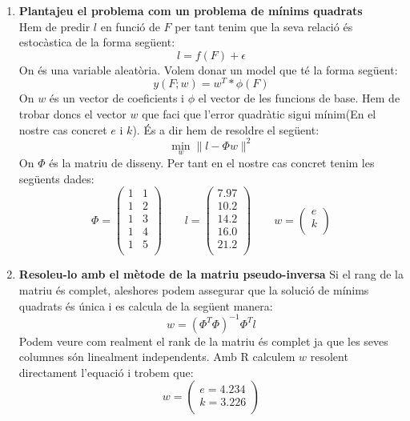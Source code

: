 \documentclass[a4paper]{article}
\begin{document}
\begin{enumerate}
	\item\textbf{Plantajeu el problema com un problema de mínims quadrats} \\
	Hem de predir $l$ en funció de $F$ per tant tenim que la seva relació és estocàstica de la forma següent:
	$$
	l = f(F) + \epsilon
	$$
	On \epsilon és una variable aleatòria. Volem donar un model que té la forma següent:
	$$
	y(F;w) = w^T * \phi(F)
	$$
	On $w$ és un vector de coeficients i $\phi$ el vector de les funcions de base. Hem de trobar doncs el vector $w$ que faci que l'error quadràtic sigui mínim(En el nostre cas concret $e$ i $k$). És a dir hem de resoldre el següent:
	$$
	\min_{w} \parallel l - \Phi w \parallel ^2
	$$
	On $\Phi$ és la matriu de disseny. Per tant en el nostre cas concret tenim les següents dades:
	$$
	\Phi = 
	\begin{pmatrix}
	1 & 1 \\
	1 & 2 \\
	1 & 3 \\
	1 & 4 \\
	1 & 5 \\
	\end{pmatrix}
	\qquad
	l =
	\begin{pmatrix}
	7.97 \\
	10.2 \\
	14.2 \\
	16.0 \\
	21.2 \\
	\end{pmatrix}
	\qquad
	w =
	\begin{pmatrix}
	e \\
	k \\
	\end{pmatrix}
	$$
	\newpage
	\item\textbf{Resoleu-lo amb el mètode de la matriu pseudo-inversa}
	Si el rang de la matriu és complet, aleshores podem assegurar que la solució de mínims quadrats és única i es calcula de la següent manera:
	$$
	w = (\Phi^T\Phi)^{-1}\Phi^Tl
	$$
	Podem veure com realment el rank de la matriu és complet ja que les seves columnes són linealment independents. Amb R calculem $w$ resolent directament l'equació i trobem que:
	$$
	w=
	\begin{pmatrix}
	e=4.234\\
	k=3.226\\
	\end{pmatrix}
	$$
	\begin{figure}[H]
		\centering

\end{figure}
\end{enumerate}
\end{document}
